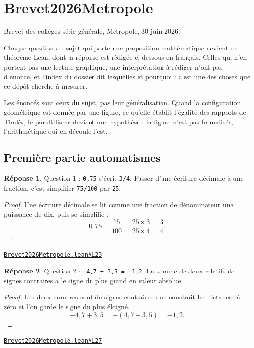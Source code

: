 \documentclass[11pt,a4paper]{article}
\theoremstyle{definition}
\theoremstyle{plain}
\theoremstyle{definition}
\newtheorem*{reponse}{Réponse}
\newcommand{\source}[2]{\par\smallskip\noindent\hfill{\footnotesize\href{#1}{\texttt{#2}}}\par\smallskip}
\begin{document}
\section{Brevet2026Metropole}

\noindent
Brevet des collèges \textemdash{} série générale, Métropole, 30 juin 2026.

Chaque question du sujet qui porte une proposition mathématique devient un théorème
Lean, dont la réponse est rédigée ci-dessous en français. Celles qui n'en portent pas \textemdash{} une lecture graphique, une interprétation
à rédiger \textemdash{} n'ont pas d'énoncé, et l'index du dossier dit lesquelles et pourquoi :
c'est une des choses que ce dépôt cherche à mesurer.

Les énoncés sont ceux du sujet, pas leur généralisation. Quand la configuration
géométrique est donnée par une figure, ce qu'elle établit \textemdash{} l'égalité des rapports
de Thalès, le parallélisme \textemdash{} devient une hypothèse : la figure n'est pas
formalisée, l'arithmétique qui en découle l'est.

\subsection{Première partie \textemdash{} automatismes}

\begin{reponse}
Question 1 : \texttt{0,75} s'écrit \texttt{3/4}. Passer d'une écriture décimale à une
fraction, c'est simplifier \texttt{75/100} par \texttt{25}.
\end{reponse}
\begin{proof}
Une écriture décimale se lit comme une fraction de dénominateur une puissance de dix, puis
se simplifie :
\[ 0{,}75 = \frac{75}{100} = \frac{25 \times 3}{25 \times 4} = \frac{3}{4} . \]
\end{proof}
\source{https://github.com/Commutator-IO/learn-lean/blob/main/exams/2026/Brevet2026Metropole.lean\#L23}{Brevet2026Metropole.lean\#L23}

\begin{reponse}
Question 2 : \texttt{−4,7 + 3,5 = −1,2}. La somme de deux relatifs de signes
contraires a le signe du plus grand en valeur absolue.
\end{reponse}
\begin{proof}
Les deux nombres sont de signes contraires : on soustrait les distances à zéro et l'on
garde le signe du plus éloigné.
\[ -4{,}7 + 3{,}5 = -(4{,}7 - 3{,}5) = -1{,}2 . \]
\end{proof}
\source{https://github.com/Commutator-IO/learn-lean/blob/main/exams/2026/Brevet2026Metropole.lean\#L27}{Brevet2026Metropole.lean\#L27}
\end{document}
